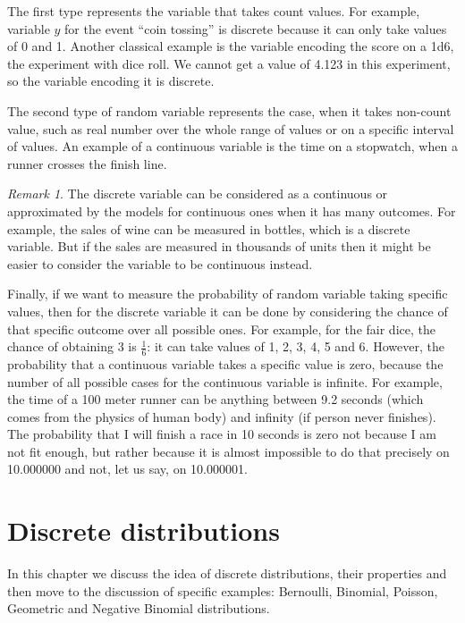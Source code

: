 \documentclass[
]{book}
\theoremstyle{definition}
\theoremstyle{definition}
\theoremstyle{definition}
\theoremstyle{definition}
\theoremstyle{remark}
\newtheorem*{remark}{Remark}
\begin{document}
The first type represents the variable that takes count values. For example, variable \(y\) for the event ``coin tossing'' is discrete because it can only take values of 0 and 1. Another classical example is the variable encoding the score on a 1d6, the experiment with dice roll. We cannot get a value of 4.123 in this experiment, so the variable encoding it is discrete.

The second type of random variable represents the case, when it takes non-count value, such as real number over the whole range of values or on a specific interval of values. An example of a continuous variable is the time on a stopwatch, when a runner crosses the finish line.

\begin{remark}
The discrete variable can be considered as a continuous or approximated by the models for continuous ones when it has many outcomes. For example, the sales of wine can be measured in bottles, which is a discrete variable. But if the sales are measured in thousands of units then it might be easier to consider the variable to be continuous instead.
\end{remark}

Finally, if we want to measure the probability of random variable taking specific values, then for the discrete variable it can be done by considering the chance of that specific outcome over all possible ones. For example, for the fair dice, the chance of obtaining 3 is \(\frac{1}{6}\): it can take values of 1, 2, 3, 4, 5 and 6. However, the probability that a continuous variable takes a specific value is zero, because the number of all possible cases for the continuous variable is infinite. For example, the time of a 100 meter runner can be anything between 9.2 seconds (which comes from the physics of human body) and infinity (if person never finishes). The probability that I will finish a race in 10 seconds is zero not because I am not fit enough, but rather because it is almost impossible to do that precisely on 10.000000 and not, let us say, on 10.000001.

\chapter{Discrete distributions}\label{countDistributions}

In this chapter we discuss the idea of discrete distributions, their properties and then move to the discussion of specific examples: Bernoulli, Binomial, Poisson, Geometric and Negative Binomial distributions.
\end{document}
